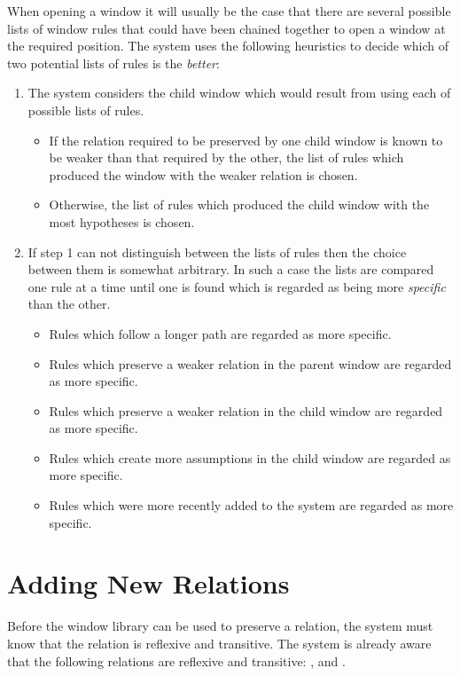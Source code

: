 When opening a window it will usually be the case that there are several
possible lists of window rules that could have been chained together 
to open a window at the required position.
The system uses the following heuristics to decide which of two potential
lists of rules is the {\it better}:
\begin{enumerate}
	\item	The system considers the child window which would result from
		using each of possible lists of rules.
		\begin{itemize}	
			\item	If the relation required to be preserved by one
				child window is known to be weaker than that
				required by the other, the list of rules
				which produced the window with the weaker
				relation is chosen.
			\item	Otherwise, the list of rules which produced
				the child window with the most hypotheses is
				chosen.
		\end{itemize}
	\item	If step 1 can not distinguish between the lists of rules then
		the choice between them is somewhat arbitrary.
		In such a case the lists are compared one rule at
		a time until one is found which is regarded as being more
		{\it specific}\/ than the other.
		\begin{itemize}
			\item	Rules which follow a longer path are regarded as
				more specific.
			\item	Rules which preserve a weaker relation in the
				parent window are regarded as more specific.
			\item	Rules which preserve a weaker relation in the
				child window are regarded as more specific.
			\item	Rules which create more assumptions in the
				child window are regarded as more specific.
			\item	Rules which were more recently added to the
				system are regarded as more specific.
		\end{itemize}
\end{enumerate}

\section{Adding New Relations}	\label{sec:rel}

Before the window library can be used to preserve a relation, the
system must know that the relation is reflexive and transitive.
The system is already aware that the following relations are reflexive
and transitive: ,  and .

